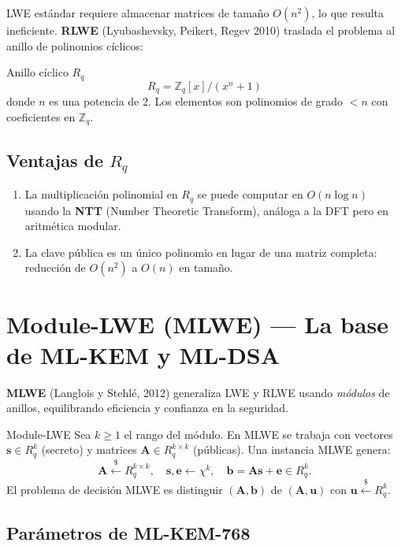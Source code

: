\documentclass[12pt,a4paper,twoside,openright]{book}
\theoremstyle{plain}
\theoremstyle{definition}
\theoremstyle{remark}
\newcommand{\Z}{\mathbb{Z}}
\newcommand{\Zq}{\mathbb{Z}_q}
\newcommand{\Rq}{R_q}
\newcommand{\vv}[1]{\mathbf{#1}}
\newcommand{\mm}[1]{\mathbf{#1}}
\begin{document}
LWE est\'andar requiere almacenar matrices de tama\~no $O(n^2)$, lo que
resulta ineficiente. \textbf{RLWE} (Lyubashevsky, Peikert, Regev 2010)
traslada el problema al anillo de polinomios c\'iclicos:

\begin{midef}{Anillo c\'iclico $R_q$}
  \[
    \Rq = \Z_q[x] / (x^n + 1)
  \]
  donde $n$ es una potencia de 2. Los elementos son polinomios de grado
  $< n$ con coeficientes en $\Zq$.
\end{midef}

\subsection{Ventajas de $R_q$}

\begin{enumerate}
  \item La multiplicaci\'on polinomial en $\Rq$ se puede computar en
    $O(n \log n)$ usando la \textbf{NTT} (Number Theoretic Transform),
    an\'aloga a la DFT pero en aritm\'etica modular.
  \item La clave p\'ublica es un \'unico polinomio en lugar de una
    matriz completa: reducci\'on de $O(n^2)$ a $O(n)$ en tama\~no.
\end{enumerate}

\section{Module-LWE (MLWE) --- La base de ML-KEM y ML-DSA}

\textbf{MLWE} (Langlois y Stehl\'e, 2012) generaliza LWE y RLWE usando
\emph{m\'odulos} de anillos, equilibrando eficiencia y confianza en la
seguridad.

\begin{midef}{Module-LWE}
  Sea $k \geq 1$ el rango del m\'odulo. En MLWE se trabaja con
  vectores $\vv{s} \in R_q^k$ (secreto) y matrices $\mm{A} \in R_q^{k \times k}$
  (p\'ublicas). Una instancia MLWE genera:
  \[
    \mm{A} \xleftarrow{\$} R_q^{k\times k}, \quad
    \vv{s}, \vv{e} \leftarrow \chi^k, \quad
    \vv{b} = \mm{A}\vv{s} + \vv{e} \in R_q^k.
  \]
  El problema de decisi\'on MLWE es distinguir $(\mm{A}, \vv{b})$ de
  $(\mm{A}, \vv{u})$ con $\vv{u} \xleftarrow{\$} R_q^k$.
\end{midef}

\subsection{Par\'ametros de ML-KEM-768}
\end{document}
